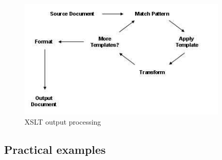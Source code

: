  
\vspace{0.5cm}
\begin{figure}[H]
  \centering
    \includegraphics[width=10cm]{images/xslt-processing.jpg}
  \caption{XSLT output processing}
  \label{fig:xslt-processing}
\end{figure}
\vspace{0.5cm}


\subsection{Practical examples}




